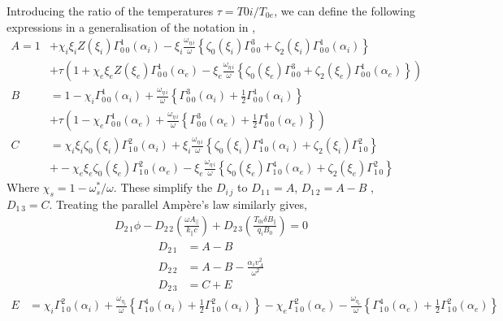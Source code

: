 \documentclass[prb,aps,amssymb,amsmath,a4paper]{revtex4}
\begin{document}
Introducing the ratio of the temperatures $\tau = T{0i}/T_{0e}$, we can define the following expressions in a generalisation of the notation in \cite{howes2006agb},
\begin{align}
\label{Adef}
A = 1 &+ \chi_i \xi_i Z(\xi_i) \Gamma^1_{0\,0}(\alpha_i) - \xi_i \frac{\omega_{\eta\,i}}{\omega} \left\{\zeta_0(\xi_i)\Gamma^{3}_{0\,0} + \zeta_2(\xi_i)\Gamma^1_{0\,0}(\alpha_i)\right\} \\ \nonumber
&+ \tau\left( 1 + \chi_e \xi_e Z(\xi_e) \Gamma^1_{0\,0}(\alpha_e) - \xi_e \frac{\omega_{\eta\,i}}{\omega} \left\{\zeta_0(\xi_e)\Gamma^{3}_{0\,0} + \zeta_2(\xi_e)\Gamma^1_{0\,0}(\alpha_e)\right\} \right)
\\
B &= 1 - \chi_i \Gamma^{1}_{0\,0}(\alpha_i) + \frac{\omega_{\eta\,i}}{\omega}\left\{ \Gamma^{3}_{0\,0}(\alpha_i)+\frac{1}{2}\Gamma^{1}_{0\,0}(\alpha_i) \right\} \\ \nonumber
&+ \tau\left(1 - \chi_e \Gamma^{1}_{0\,0}(\alpha_e) + \frac{\omega_{\eta\,i}}{\omega}\left\{ \Gamma^{3}_{0\,0}(\alpha_e)+\frac{1}{2}\Gamma^{1}_{0\,0}(\alpha_e) \right\}\right) 
\\
C &= \chi_i \xi_i \zeta_0(\xi_i) \Gamma^{2}_{1\,0}(\alpha_i) + \xi_i \frac{\omega_{\eta\,i}}{\omega}\left\{ \zeta_0(\xi_i) \Gamma^{4}_{1\,0}(\alpha_i) + \zeta_2(\xi_i) \Gamma^{2}_{1\,0}\right\} \\ \nonumber
&+ - \chi_e \xi_e \zeta_0(\xi_e) \Gamma^{2}_{1\,0}(\alpha_e) - \xi_e \frac{\omega_{\eta\,i}}{\omega}\left\{ \zeta_0(\xi_e) \Gamma^{4}_{1\,0}(\alpha_e) + \zeta_2(\xi_e) \Gamma^{2}_{1\,0}\right\} 
\end{align}
Where $\chi_s = 1 - \omega^{*}_s / \omega$. These simplify the $D_{i\,j}$ to $D_{1\,1} = A$, $D_{1\,2} = A - B$ , $D_{1\,3} = C$. Treating the parallel Amp\`ere's law similarly gives,
\begin{align}
D_{2\,1}\phi - D_{2\,2} \left(\frac{\omega A_\parallel}{k_\parallel c}\right) + D_{2\,3} \left(\frac{T_{0i} \delta B_\parallel}{q_i B_0}\right)  = 0
\end{align}
\begin{align}
\nonumber
D_{2\,1} &= A - B \\ \nonumber
D_{2\,2} &= A - B - \frac{\alpha_i v^2_{A}}{\omega^2} \\ \nonumber
D_{2\,3} &= C + E
\end{align}
\begin{align}
E &= \chi_i \Gamma^{2}_{1\,0}(\alpha_i) + \frac{\omega_{\eta_i}}{\omega}\left\{ \Gamma^{4}_{1\,0}(\alpha_i) + \frac{1}{2}\Gamma^{2}_{1\,0}(\alpha_i)\right\}
- \chi_e \Gamma^{2}_{1\,0}(\alpha_e) - \frac{\omega_{\eta_e}}{\omega}\left\{ \Gamma^{4}_{1\,0}(\alpha_e) + \frac{1}{2}\Gamma^{2}_{1\,0}(\alpha_e)\right\}
\end{align}
\end{document}
